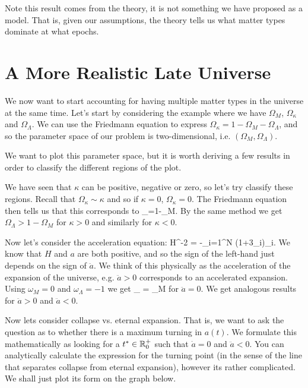 Note this result comes from the theory, it is not something we have proposed as a model. That is, given our assumptions, the theory tells us what matter types dominate at what epochs.

\section{A More Realistic Late Universe}

We now want to start accounting for having multiple matter types in the universe at the same time. Let's start by considering the example where we have $\Omega_M$, $\Omega_{\kappa}$ and $\Omega_{\Lambda}$. We can use the Friedmann equation to express $\Omega_{\kappa}= 1 - \Omega_M - \Omega_{\Lambda}$, and so the parameter space of our problem is two-dimensional, i.e. $(\Omega_M,\Omega_{\Lambda})$.

We want to plot this parameter space, but it is worth deriving a few results in order to classify the different regions of the plot.

\benr 
    \item We have seen that $\kappa$ can be positive, negative or zero, so let's try classify these regions. Recall that $\Omega_{\kappa}\sim\kappa$ and so if $\kappa=0$, $\Omega_{\kappa}=0$. The Friedmann equation then tells us that this corresponds to 
    \bse 
        \Omega_{\Lambda}=1-\Omega_M.
    \ese 
    By the same method we get $\Omega_{\Lambda}>1-\Omega_M$ for $\kappa>0$ and similarly for $\kappa<0$.
    \item Now let's consider the acceleration equation:
    \bse 
        H^{-2} = -\sum_{i=1}^N (1+3\omega_i)\Omega_i.
    \ese 
    We know that $H$ and $a$ are both positive, and so the sign of the left-hand just depends on the sign of $\ddot{a}$. We think of this physically as the acceleration of the expansion of the universe, e.g. $\ddot{a}>0$ corresponds to an accelerated expansion. Using $\omega_M=0$ and $\omega_{\Lambda}=-1$ we get 
    \bse 
        \Omega_{\Lambda} = \Omega_M
    \ese 
    for $\ddot{a}=0$. We get analogous results for $\ddot{a}>0$ and $\ddot{a}<0$.
    \item Now lets consider collapse vs. eternal expansion. That is, we want to ask the question as to whether there is a maximum turning in $a(t)$. We formulate this mathematically as looking for a $t^*\in\mathbb{R}^+_0$ such that $\dot{a}=0$ and $\ddot{a}<0$. You can analytically calculate the expression for the turning point (in the sense of the line that separates collapse from eternal expansion), however its rather complicated. We shall just plot its form on the graph below. 
\een    

